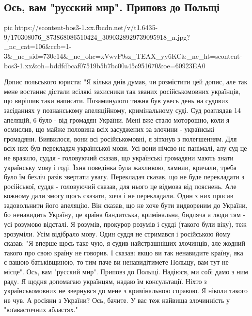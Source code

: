  
 
 
 
 

\subsection{Ось, вам "русский мир". Приповз до Польщі}
\label{sec:06_04_2021.fb.ivanova_galina.1.rusmir_polsha_ukraina_jazyk_mova}

\ifcmt
  pic https://scontent-bos3-1.xx.fbcdn.net/v/t1.6435-9/170308076_873868086510424_3090328929739095918_n.jpg?_nc_cat=106&ccb=1-3&_nc_sid=730e14&_nc_ohc=xVwvP9sz_TEAX_yy6KC&_nc_ht=scontent-bos3-1.xx&oh=bddfdbcaf07519b5b7bc00a45c951670&oe=60923EA0
\fi

Допис польського юриста:
"Я кілька днів думав, чи розмістити цей допис, але так мене востаннє дістали всілякі захисники так званих російськомовних українців, що вирішив таки написати.
Позаминулого тижня був увесь день на судових засіданнях у познанському апеляційному, кримінальному суді. Суд розглядав 14 апеляцій, 6 було - від громадян України. Мені вже стало моторошно, коли я осмислив, що майже половина всіх засуджених за злочини - українські громадяни.
Виявилося, вони всі російськомовні, я зітхнув з полегшенням.
Для всіх них був перекладач української мови.
Усі вони нічєво нє панімалі, алу суд це не вразило, суддя - головуючий сказав, що українські громадяни мають знати українську мову і годі.
Їхня поведінка була жахливою, хамили, кричали, треба було їм безліч разів звертати увагу. Перекладач сказав, що не буде перекладати з російської, суддя - головуючий сказав, для нього це відмова від пояснень. Але кожному дали змогу щось сказати, хоча і не перекладали.
Один з них просив задовольнити його апеляцію. Він сказав, що не хоче бути видвореним до України, бо ненавидить Україну, це країна бандитська, кримінальна, бидляча а люди там - усі розумово відсталі.
Я розумів, прокурор розумів і судді (такого були віку), теж зрозуміли. Усім відібрало мову.
Один суддя не стримався і російською йому сказав: "Я вперше щось таке чую, я судив найстрашніших злочинців, але жодний такого про свою країну не говорив. І сказав: якщо ви так ненавидите країну, яка є вашою батьківщиною, то тим паче ви ненавидітимете Польщу, вам тут не місце".
Ось, вам "русский мир". Приповз до Польщі. Надіюся, ми собі дамо з ним раду.
Я щодня допомагаю українцям, надаю їм консультації. Ніхто з українськомовних не звернувся до мене з кримінальною справою. Я ніколи такого не чув. А росіяни з України? Ось, бачите.
У вас теж найвища злочинність у "юґавасточних абластях."
